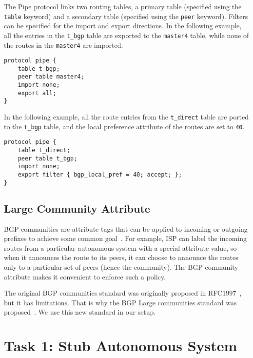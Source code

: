 The Pipe protocol links two routing tables, a primary table (specified using
the \texttt{table} keyword) and a secondary table (specified using 
the \texttt{peer} keyword). Filters can be specified for the import
and export directions. In the following example, all the entries
in the \texttt{t\_bgp} table are exported to the \texttt{master4} table,
while none of the routes in the \texttt{master4} are imported. 

\begin{lstlisting}
protocol pipe {
    table t_bgp;
    peer table master4;
    import none;
    export all;
}
\end{lstlisting}

In the following example, all the route entries from the \texttt{t\_direct}
table are ported to the \texttt{t\_bgp} table, and the local preference
attribute of the routes are set to \texttt{40}.

\begin{lstlisting}
protocol pipe {
    table t_direct;
    peer table t_bgp;
    import none;
    export filter { bgp_local_pref = 40; accept; };
}
\end{lstlisting}
 


\subsection{Large Community Attribute} 

BGP communities are attribute tags that can be applied to incoming or outgoing prefixes to
achieve some common goal~\cite{rfc1997}. For example, ISP can label the incoming routes 
from a particular autonomous system with a special attribute value, 
so when it announces the route to its peers, it can choose to announce 
the routes only to a particular set of peers (hence the community). 
The BGP community attribute makes it convenient to enforce such a policy.

The original BGP communities standard was originally proposed in RFC1997~\cite{rfc1997},
but it has limitations. That is why the BGP Large communities 
standard was proposed~\cite{rfc}. We use this new standard in our 
setup. 






\section{Task 1: Stub Autonomous System} 


